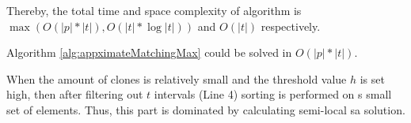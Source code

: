 Thereby, the total time and space complexity of algorithm is $\max (O(|p|*|t|), O(|t|* \log |t| ))$ and $O(|t|)$  respectively.
 

\begin{corollary}
Algorithm \ref{alg:appximateMatchingMax} could  be solved in 
$O(|p| * |t|)$.
\end{corollary}

When the amount of clones is relatively small and the threshold value $h$ is set high,  then after filtering out $t$ intervals (Line 4) sorting is performed on s small set of elements.
Thus, this part is dominated by calculating semi-local sa solution.







  


 
